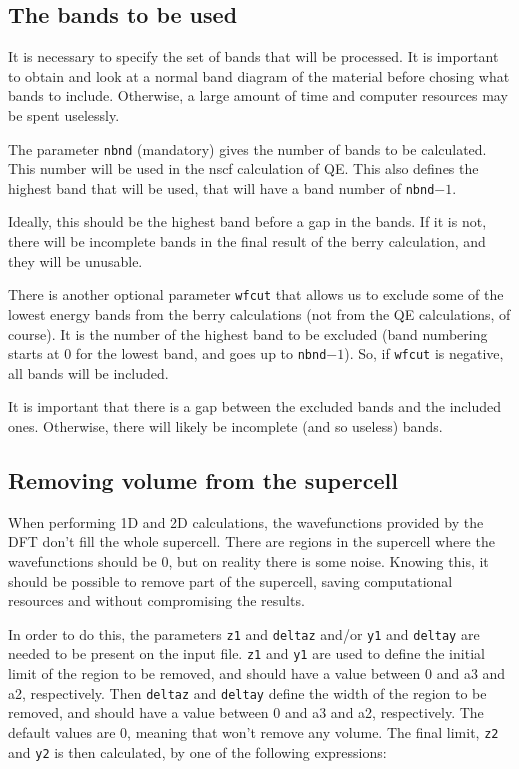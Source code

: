 \documentclass[a4paper,12pt]{report}
\begin{document}
\bigskip

 \subsection{The bands to be used}

 It is necessary to specify the set of bands that will be processed.
 It is important to obtain and look at a normal band diagram of the material before chosing
 what bands to include.
 Otherwise, a large amount of time and computer resources may be spent uselessly.

 The parameter \verb|nbnd| (mandatory) gives the number of bands to be calculated.
 This number will be used in the nscf calculation of QE.
 This also defines the highest band that will be used, that will have a band number of \verb|nbnd|$-1$.

 Ideally, this should be the highest band before a gap in the bands.
 If it is not, there will be incomplete bands in the final result of the berry calculation,
 and they will be unusable.

 There is another optional parameter \verb|wfcut| that allows us to exclude some of the lowest energy bands
 from the berry calculations (not from the QE calculations, of course).
 It is the number of the highest band to be excluded
 (band numbering starts at 0 for the lowest band, and goes up to \verb|nbnd|$-1$).
 So, if \verb|wfcut| is negative, all bands will be included.

 It is important that there is a gap between the excluded bands and the included ones.
 Otherwise, there will likely be incomplete (and so useless) bands.


\bigskip

 \subsection{Removing volume from the supercell}

 When performing 1D and 2D calculations, the wavefunctions provided by the DFT don't fill the whole
 supercell.
 There are regions in the supercell where the wavefunctions should be 0, but on reality 
 there is some noise.
 Knowing this, it should be possible to remove part of the supercell, saving computational
 resources and without compromising the results.

 In order to do this, the parameters \verb|z1| and \verb|deltaz| and/or \verb|y1| and \verb|deltay| 
 are needed to be present on the input file.
 \verb|z1| and \verb|y1| are used to define the initial limit of the region to be removed, and 
 should have a value between 0 and a3 and a2, respectively.
 Then \verb|deltaz| and \verb|deltay| define the width of the region to be removed, and should have 
 a value between 0 and a3 and a2, respectively. The default values are 0, meaning that won't remove 
 any volume.
 The final limit, \verb|z2| and \verb|y2| is then calculated, by one of the following expressions:
 
\end{document}
